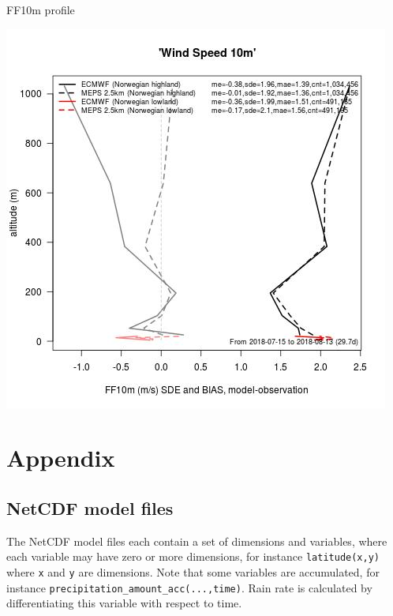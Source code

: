 \documentclass[letterpaper,10pt,twoside,twocolumn,openany]{book}
\begin{document}
{\begin{paperbox}{FF10m profile}
  \centerline{\includegraphics[width=0.75\columnwidth]{ff10m_prof.jpg}}
\end{paperbox}




\newpage
\hypertarget{appendix}{}
\section{Appendix}
\hypertarget{netcdf}{}
\subsection{NetCDF model files}
The NetCDF model files each contain a set of dimensions and variables, 
where each variable may have zero or more dimensions, for instance \lstinline!latitude(x,y)! where
\lstinline!x! and \lstinline!y! are dimensions. 
Note that some variables are accumulated, for instance \lstinline!precipitation_amount_acc(...,time)!. 
Rain rate is calculated by differentiating this variable with respect to time.

}
\end{document}

